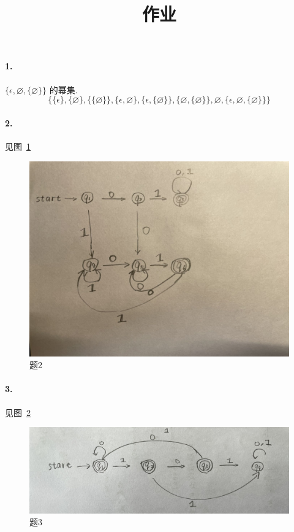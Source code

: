 \documentclass[12pt]{ctexart}
\theoremstyle{definition}
\theoremstyle{definition}
\theoremstyle{plain}
\theoremstyle{remark}
\begin{document}
\title{作业}
\maketitle
\paragraph{1. } \(\{ \epsilon , \varnothing, \{ \varnothing \}\}\) 的幂集. 
\[
\{ 
	\{ \epsilon \} , \{ \varnothing \} , \{ \{ \varnothing \}\} ,
	\{ \epsilon , \varnothing  \},  \{ \epsilon , \{ \varnothing  \} \} , \{ \varnothing  , \{ \varnothing  \}\} , 
	\varnothing  , \{ \epsilon , \varnothing , \{ \varnothing  \} \} 
\}
\]

\paragraph{2. } 见图~\ref{fig:2}
\begin{figure}[h]
	\centering
	\includegraphics[width=\linewidth]{hw01_2.jpg}
	\caption{题2}\label{fig:2}
\end{figure}

\paragraph{3. } 见图~\ref{fig:3}
\begin{figure}[h]
	\centering
	\includegraphics[width=\linewidth]{hw01_3.jpg}
	\caption{题3}\label{fig:3}
\end{figure}
\end{document}
